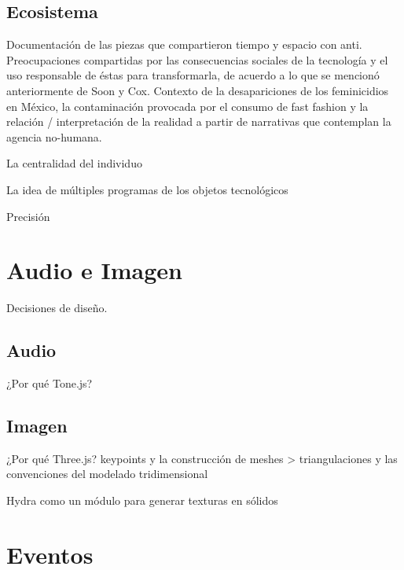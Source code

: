 \subsection{Ecosistema}

Documentación de las piezas que compartieron tiempo y espacio con anti. Preocupaciones compartidas por las consecuencias sociales de la tecnología y el uso responsable de éstas para transformarla, de acuerdo a lo que se mencionó anteriormente de Soon y Cox. Contexto de la desapariciones de los feminicidios en México, la contaminación provocada por el consumo de fast fashion y la relación / interpretación de la realidad a partir de narrativas que contemplan la agencia no-humana. 

La centralidad del individuo 

La idea de múltiples programas de los objetos tecnológicos \citep{latour}


Precisión 

\section{Audio e Imagen} %

Decisiones de diseño.

\subsection{Audio}

¿Por qué Tone.js? 

\subsection{Imagen}

¿Por qué Three.js?
keypoints y la construcción de meshes > triangulaciones y las convenciones del modelado tridimensional 

Hydra como un módulo para generar texturas en sólidos 


\section{Eventos}

